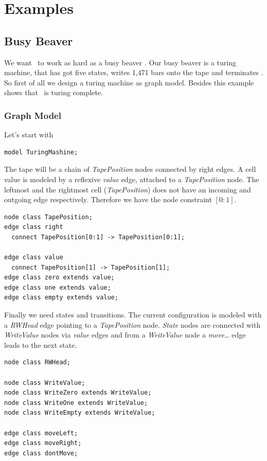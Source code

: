 \chapter{Examples}
\label{anexample}
\section{Busy Beaver}
We want \GrG\ to work as hard as a busy beaver \cite{kroll, bb}. Our busy beaver is a turing machine, that has got five states, writes 1,471 bars onto the tape and terminates \cite{beaver}. So first of all we design a turing machine as graph model. Besides this example shows that \GrG\ is turing complete. 

\subsection{Graph Model}
Let's start with
\lstset{language=grgenmodel}
\begin{lstlisting}[name=gr]
model TuringMashine;
\end{lstlisting}

The tape will be a chain of \emph{TapePosition} nodes connected by right edges. A cell value is modeled by a reflexive \emph{value} edge, attached to a \emph{TapePosition} node. The leftmost and the rightmost cell (\emph{TapePosition}) does not have an incoming and outgoing edge respectively. Therefore we have the node constraint $[0:1]$.
\lstset{language=grgenmodel}
\begin{lstlisting}[name=gr]
node class TapePosition; 
edge class right
  connect TapePosition[0:1] -> TapePosition[0:1];
  
edge class value
  connect TapePosition[1] -> TapePosition[1];  
edge class zero extends value;
edge class one extends value;
edge class empty extends value;  
\end{lstlisting}
Finally we need states and transitions. The current configuration is modeled with a \emph{RWHead} edge pointing to a \emph{TapePosition} node. \emph{State} nodes are connected with \emph{WriteValue} nodes via \emph{value} edges and from a \emph{WriteValue} node a \emph{move\dots} edge leads to the next state.
\begin{lstlisting}[name=gr]
node class RWHead;

node class WriteValue;
node class WriteZero extends WriteValue;
node class WriteOne extends WriteValue;
node class WriteEmpty extends WriteValue; 

edge class moveLeft;
edge class moveRight;
edge class dontMove;
\end{lstlisting}

